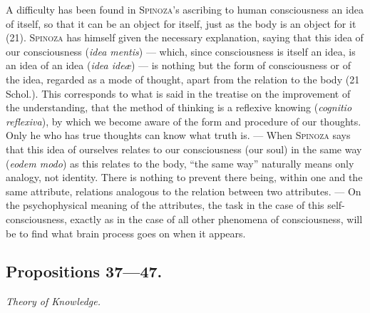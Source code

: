 \documentclass[12pt]{article}
\newcommand{\opage}[1]{\marginnote{\footnotesize\textit{[#1]}}}
\begin{document}
A difficulty has been found in \textsc{Spinoza}'s ascribing to human consciousness an idea
of itself, so that it can be an object for itself, just as the body is an object for it
(21). \textsc{Spinoza} has himself given the necessary explanation, saying that this idea
of our consciousness (\textit{idea mentis}) --- which, since consciousness is itself an
idea, is an idea of an idea (\textit{idea ideæ}) --- is nothing but the form of
consciousness or of the idea, regarded as a mode of thought, apart from the relation to the
body (21 Schol.). This corresponds to what is said in the treatise on the improvement of
the understanding, that the method of thinking is a reflexive knowing (\textit{cognitio
reflexiva}), by which we become aware of the form and procedure of our thoughts. Only he who
has true thoughts can know what truth is. --- When \textsc{Spinoza} says that this idea of
ourselves relates to our consciousness (our soul) in the same way (\textit{eodem modo}) as
this relates to the body, ``the same way'' naturally means only analogy, not identity.
There is nothing to prevent there being, within one and the same attribute, relations
analogous to the relation between two attributes. --- On the psychophysical meaning of the
attributes, \opage{47}the task in the case of this self-consciousness, exactly as in the case
of all other phenomena of consciousness, will be to find what brain process goes on when it
appears.

\subsection*{Propositions 37---47.}
\begin{center}\textit{Theory of Knowledge.}\end{center}
\end{document}
